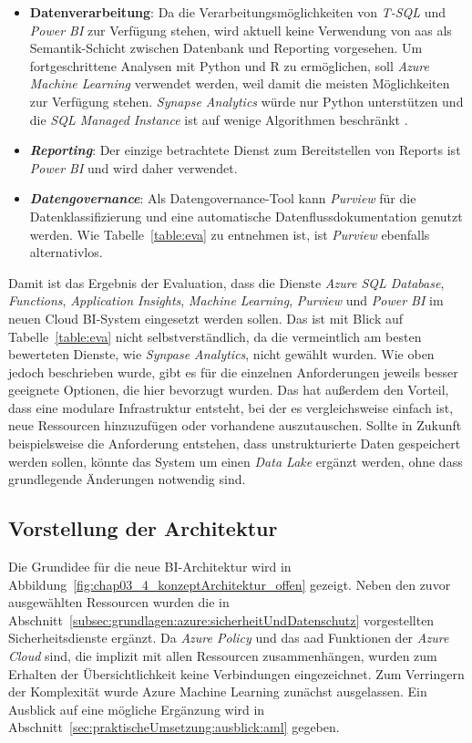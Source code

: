 \begin{itemize}
\item \textbf{Datenverarbeitung}: Da die Verarbeitungsmöglichkeiten von \textit{T-SQL} und \textit{Power BI} zur Verfügung stehen, wird aktuell keine Verwendung von \ac{aas} als Semantik-Schicht zwischen Datenbank und Reporting vorgesehen. Um fortgeschrittene Analysen mit Python und R zu ermöglichen, soll \textit{Azure Machine Learning} verwendet werden, weil damit die meisten Möglichkeiten zur Verfügung stehen. \textit{Synapse Analytics} würde nur Python unterstützen und die \textit{SQL Managed Instance} ist auf wenige Algorithmen beschränkt \cite{etaati_introduction_2019}.
\item \textit{\textbf{Reporting}}: Der einzige betrachtete Dienst zum Bereitstellen von Reports ist \textit{Power BI} und wird daher verwendet.
\item \textit{\textbf{Datengovernance}}: Als Datengovernance-Tool kann \textit{Purview} für die Datenklassifizierung und eine automatische Datenflussdokumentation genutzt werden. Wie Tabelle~\ref{table:eva} zu entnehmen ist, ist \textit{Purview} ebenfalls alternativlos.
\end{itemize}
 
 Damit ist das Ergebnis der Evaluation, dass die Dienste \textit{Azure SQL Database}, \textit{Functions}, \textit{Application Insights}, \textit{Machine Learning}, \textit{Purview} und \textit{Power BI} im neuen Cloud BI-System eingesetzt werden sollen. Das ist mit Blick auf Tabelle~\ref{table:eva} nicht selbstverständlich, da die vermeintlich am besten bewerteten Dienste, wie \textit{Synpase Analytics}, nicht gewählt wurden. Wie oben jedoch beschrieben wurde, gibt es für die einzelnen Anforderungen jeweils besser geeignete Optionen, die hier bevorzugt wurden. Das hat außerdem den Vorteil, dass eine modulare Infrastruktur entsteht, bei der es vergleichsweise einfach ist, neue Ressourcen hinzuzufügen oder vorhandene auszutauschen. Sollte in Zukunft beispielsweise die Anforderung entstehen, dass unstrukturierte Daten gespeichert werden sollen, könnte das System um einen \textit{Data Lake} ergänzt werden, ohne dass grundlegende Änderungen notwendig sind.




\subsection{Vorstellung der Architektur}
Die Grundidee für die neue BI-Architektur wird in Abbildung~\ref{fig:chap03_4_konzeptArchitektur_offen} gezeigt. Neben den zuvor ausgewählten Ressourcen wurden die in Abschnitt~\ref{subsec:grundlagen:azure:sicherheitUndDatenschutz} vorgestellten Sicherheitsdienste ergänzt. Da \textit{Azure Policy} und das \ac{aad} Funktionen der \textit{Azure Cloud} sind, die implizit mit allen Ressourcen zusammenhängen, wurden zum Erhalten der Übersichtlichkeit keine Verbindungen eingezeichnet. Zum Verringern der Komplexität wurde Azure Machine Learning zunächst ausgelassen. Ein Ausblick auf eine mögliche Ergänzung wird in Abschnitt~\ref{sec:praktischeUmsetzung:ausblick:aml} gegeben.

